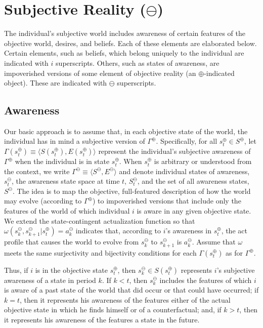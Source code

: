 \documentclass[
11pt,
titlepage,
reqno,
]{article}%
\theoremstyle{definition}
\begin{document}
	

\section{Subjective Reality ($\ominus$)}
The individual's subjective world includes awareness of certain features of the objective world, desires, and beliefs. 
Each of these elements are elaborated below. 
Certain elements, such as beliefs, which belong uniquely to the individual are indicated with $i$ superscripts.
Others, such as states of awareness, are impoverished versions of some element of objective reality (an $\oplus$-indicated object). 
These are indicated with $\ominus$ superscripts.

\subsection{Awareness}
Our basic approach is to assume that, in each objective state of the world, the individual has in mind a subjective version of $\Gamma^\oplus$. 
Specifically, for all $s^\oplus_t\in S^\oplus$, let $\Gamma(s^\oplus_t)\equiv\langle S(s^\oplus_t),E(s^\oplus_t)\rangle$ represent the individual's subjective awareness of $\Gamma^\oplus$ when the individual is in state $s^\oplus_t$.
When $s^\oplus_t$ is arbitrary or understood from the context, we write $\Gamma^\ominus\equiv\langle S^\ominus,E^\ominus\rangle$ and denote individual states of awareness, $s^\ominus_t$, the awareness state space at time $t$,  $S^\ominus_t$, and the set of all awareness states, $S^\ominus$.
The idea is to map the objective, full-featured description of how the world may evolve (according to $\Gamma^\oplus$) to impoverished versions that include only the features of the world of which individual $i$ is aware in any given objective state.
We extend the state-contingent actualization function so that $\omega (s^\ominus_k,s^\ominus_{k+1}|s^\oplus_t)=a^\ominus_k$ indicates that, according to $i$'s awareness in $s^\oplus_t$, the act profile that causes the world to evolve from $s^\ominus_k$ to $s^\ominus_{k+1}$ is $a^\ominus_k$.
Assume that $\omega$ meets the same surjectivity and bijectivity conditions for each $\Gamma(s^\oplus_t)$ as for $\Gamma^\oplus$.


Thus, if $i$ is in the objective state $s^\oplus_t$, then  $s^\ominus_k\in S(s^\oplus_t)$ represents $i$'s subjective awareness of a state in period $k$.
If $k<t$, then  $s^\ominus_k$ includes the features of which $i$ is aware of a past state of the world that did occur or that could have occurred; if $k=t$, then  it represents his awareness of the features either of the actual objective state in which he finds himself or of a counterfactual; and, if $k>t$, then  it represents his awareness of the features a state in the future.
\end{document}
